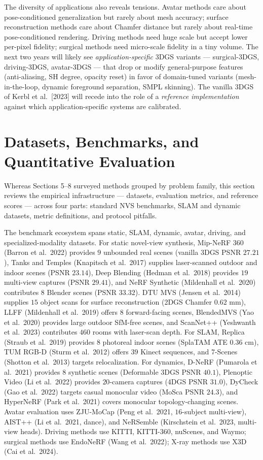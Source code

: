 The diversity of applications also reveals tensions. Avatar methods care about pose-conditioned generalization but rarely about mesh accuracy; surface reconstruction methods care about Chamfer distance but rarely about real-time pose-conditioned rendering. Driving methods need huge scale but accept lower per-pixel fidelity; surgical methods need micro-scale fidelity in a tiny volume. The next two years will likely see \emph{application-specific} 3DGS variants --- surgical-3DGS, driving-3DGS, avatar-3DGS --- that drop or modify general-purpose features (anti-aliasing, SH degree, opacity reset) in favor of domain-tuned variants (mesh-in-the-loop, dynamic foreground separation, SMPL skinning). The vanilla 3DGS of Kerbl et al.~{[}2023{]} will recede into the role of a \emph{reference implementation} against which application-specific systems are calibrated.

\section{Datasets, Benchmarks, and Quantitative Evaluation}\label{datasets-benchmarks-and-quantitative-evaluation}

Whereas Sections 5--8 surveyed methods grouped by problem family, this section reviews the empirical infrastructure --- datasets, evaluation metrics, and reference scores --- across four parts: standard NVS benchmarks, SLAM and dynamic datasets, metric definitions, and protocol pitfalls.

The benchmark ecosystem spans static, SLAM, dynamic, avatar, driving, and specialized-modality datasets. For static novel-view synthesis, Mip-NeRF 360 (Barron et al.~2022) provides \(9\) unbounded real scenes (vanilla 3DGS PSNR \(27.21\)), Tanks and Temples (Knapitsch et al.~2017) supplies laser-scanned outdoor and indoor scenes (PSNR \(23.14\)), Deep Blending (Hedman et al.~2018) provides \(19\) multi-view captures (PSNR \(29.41\)), and NeRF Synthetic (Mildenhall et al.~2020) contributes \(8\) Blender scenes (PSNR \(33.32\)). DTU MVS (Jensen et al.~2014) supplies \(15\) object scans for surface reconstruction (2DGS Chamfer \(0.62\) mm), LLFF (Mildenhall et al.~2019) offers \(8\) forward-facing scenes, BlendedMVS (Yao et al.~2020) provides large outdoor SfM-free scenes, and ScanNet++ (Yeshwanth et al.~2023) contributes \(460\) rooms with laser-scan depth. For SLAM, Replica (Straub et al.~2019) provides \(8\) photoreal indoor scenes (SplaTAM ATE \(0.36\) cm), TUM RGB-D (Sturm et al.~2012) offers \(39\) Kinect sequences, and 7-Scenes (Shotton et al.~2013) targets relocalization. For dynamics, D-NeRF (Pumarola et al.~2021) provides \(8\) synthetic scenes (Deformable 3DGS PSNR \(40.1\)), Plenoptic Video (Li et al.~2022) provides \(20\)-camera captures (4DGS PSNR \(31.0\)), DyCheck (Gao et al.~2022) targets casual monocular video (MoSca PSNR \(24.3\)), and HyperNeRF (Park et al.~2021) covers monocular topology-changing scenes. Avatar evaluation uses ZJU-MoCap (Peng et al.~2021, \(16\)-subject multi-view), AIST++ (Li et al.~2021, dance), and NeRSemble (Kirschstein et al.~2023, multi-view heads). Driving methods use KITTI, KITTI-360, nuScenes, and Waymo; surgical methods use EndoNeRF (Wang et al.~2022); X-ray methods use X3D (Cai et al.~2024).

